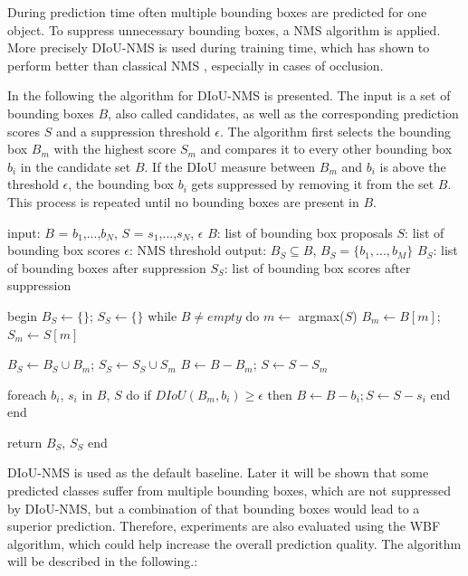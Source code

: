 During prediction time often multiple bounding boxes are predicted for one object.
To suppress unnecessary bounding boxes, a \ac{NMS} algorithm is applied.
More precisely \ac{DIoU}-\ac{NMS} \cite{diou} is used during training time, which has shown to perform better than classical \ac{NMS} \cite{soft_nms}, especially in cases of occlusion.

In the following the algorithm for \ac{DIoU}-\ac{NMS} is presented.
The input is a set of bounding boxes $B$, also called candidates, as well as the corresponding prediction scores $S$ and a suppression threshold $\epsilon$.
The algorithm first selects the bounding box $B_m$ with the highest score $S_m$ and compares it to every other bounding box $b_i$ in the candidate set $B$.
If the \ac{DIoU} measure between $B_m$ and $b_i$ is above the threshold $\epsilon$, the bounding box $b_i$ gets suppressed by removing it from the set $B$.
This process is repeated until no bounding boxes are present in $B$.

\begin{algorithm}[caption={DIoU-NMS Algorithm TODO caption to bottom and format}, label={alg1}]
input:  $B$ = {$b_1$,...,$b_N$}, $S$ = {$s_1$,...,$s_N$}, $\epsilon$
        $B$: list of bounding box proposals
        $S$: list of bounding box scores
        $\epsilon$: NMS threshold
output: $B_S \subseteq B$, $B_S = \{b_1,...,b_M\}$
        $B_S$: list of bounding boxes after suppression
        $S_S$: list of bounding box scores after suppression

begin
$B_S \gets \{\}$; $S_S \gets \{\}$
while $B \neq empty$ do
    $m \gets$ argmax($S$)
    $B_m \gets B[m]$; $S_m \gets S[m]$

    $B_S \gets B_S \cup B_m$; $S_S \gets S_S \cup S_m$
    $B \gets B - B_m$; $S \gets S - S_m$

    foreach $b_i$, $s_i$ in $B$, $S$ do
        if $DIoU(B_m, b_i) \geq \epsilon$ then
            $B \gets B - b_i; S \gets S - s_i$
        end
    end

    return $B_S$, $S_S$
end
\end{algorithm}

DIoU-NMS is used as the default baseline. Later it will be shown that some predicted classes suffer from multiple bounding boxes, which are not suppressed by DIoU-NMS, but a combination of that bounding boxes would lead to a superior prediction.
Therefore, experiments are also evaluated using the \ac{WBF} \cite{weighted_bbox_fusion} algorithm, which could help increase the overall prediction quality. The algorithm will be described in the following.:

